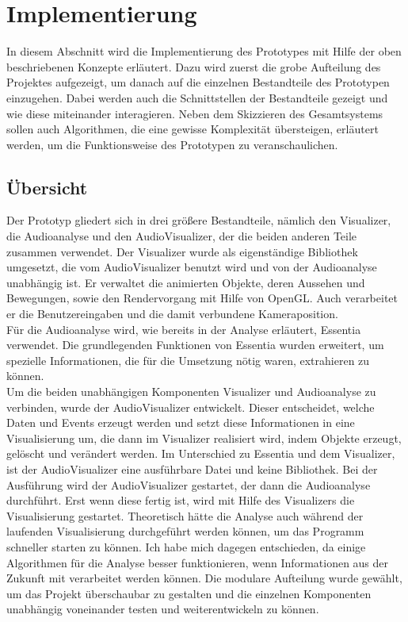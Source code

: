 \documentclass[11pt,a4paper]{article}
\begin{document}
\newpage

\section{Implementierung}
In diesem Abschnitt wird die Implementierung des Prototypes mit Hilfe der oben beschriebenen Konzepte erläutert. Dazu wird zuerst die grobe Aufteilung des Projektes aufgezeigt, um danach auf die einzelnen Bestandteile des Prototypen einzugehen. Dabei werden auch die Schnittstellen der Bestandteile gezeigt und wie diese miteinander interagieren. Neben dem Skizzieren des Gesamtsystems sollen auch Algorithmen, die eine gewisse Komplexität übersteigen, erläutert werden, um die Funktionsweise des Prototypen zu veranschaulichen.

\subsection{Übersicht}
Der Prototyp gliedert sich in drei größere Bestandteile, nämlich den Visualizer, die Audioanalyse und den AudioVisualizer, der die beiden anderen Teile zusammen verwendet. Der Visualizer wurde als eigenständige Bibliothek umgesetzt, die vom AudioVisualizer benutzt wird und von der Audioanalyse unabhängig ist. Er verwaltet die animierten Objekte, deren Aussehen und Bewegungen, sowie den Rendervorgang mit Hilfe von OpenGL. Auch verarbeitet er die Benutzereingaben und die damit verbundene Kameraposition.\\
Für die Audioanalyse wird, wie bereits in der Analyse erläutert, Essentia verwendet. Die grundlegenden Funktionen von Essentia wurden erweitert, um spezielle Informationen, die für die Umsetzung nötig waren, extrahieren zu können.\\
Um die beiden unabhängigen Komponenten Visualizer und Audioanalyse zu verbinden, wurde der AudioVisualizer entwickelt. Dieser entscheidet, welche Daten und Events erzeugt werden und setzt diese Informationen in eine Visualisierung um, die dann im Visualizer realisiert wird, indem Objekte erzeugt, gelöscht und verändert werden. Im Unterschied zu Essentia und dem Visualizer, ist der AudioVisualizer eine ausführbare Datei und keine Bibliothek. Bei der Ausführung wird der AudioVisualizer gestartet, der dann die Audioanalyse durchführt. Erst wenn diese fertig ist, wird mit Hilfe des Visualizers die Visualisierung gestartet. Theoretisch hätte die Analyse auch während der laufenden Visualisierung durchgeführt werden können, um das Programm schneller starten zu können. Ich habe mich dagegen entschieden, da einige Algorithmen für die Analyse besser funktionieren, wenn Informationen aus der Zukunft mit verarbeitet werden können. Die modulare Aufteilung wurde gewählt, um das Projekt überschaubar zu gestalten und die einzelnen Komponenten unabhängig voneinander testen und weiterentwickeln zu können.
\end{document}
